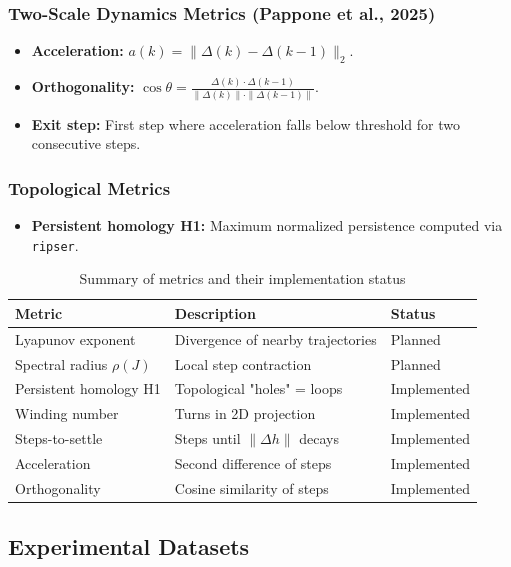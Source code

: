 \documentclass[12pt,a4paper]{article}
\begin{document}
\subsubsection{Two-Scale Dynamics Metrics (Pappone et al., 2025)}
\begin{itemize}
    \item \textbf{Acceleration:} $a(k) = \|\Delta(k) - \Delta(k-1)\|_2$.
    \item \textbf{Orthogonality:} $\cos\theta = \frac{\Delta(k) \cdot \Delta(k-1)}{\|\Delta(k)\| \cdot \|\Delta(k-1)\|}$.
    \item \textbf{Exit step:} First step where acceleration falls below threshold for two consecutive steps.
\end{itemize}

\subsubsection{Topological Metrics}
\begin{itemize}
    \item \textbf{Persistent homology H1:} Maximum normalized persistence computed via \texttt{ripser}.
\end{itemize}

\begin{table}[h]
\centering
\caption{Summary of metrics and their implementation status}
\begin{tabular}{p{3.5cm}p{4cm}p{4cm}}
\toprule
Metric & Description & Status \\
\midrule
Lyapunov exponent & Divergence of nearby trajectories & Planned \\
Spectral radius $\rho(J)$ & Local step contraction & Planned \\
Persistent homology H1 & Topological "holes" = loops & Implemented \\
Winding number & Turns in 2D projection & Implemented \\
Steps-to-settle & Steps until $\|\Delta h\|$ decays & Implemented \\
Acceleration & Second difference of steps & Implemented \\
Orthogonality & Cosine similarity of steps & Implemented \\
\bottomrule
\end{tabular}
\end{table}

\subsection{Experimental Datasets}
\end{document}
